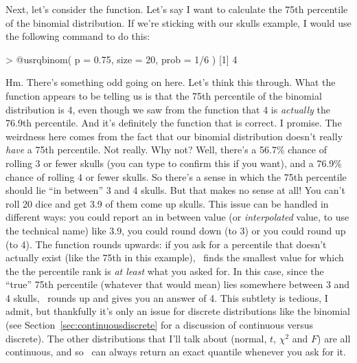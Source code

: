Next, let's consider the  function. Let's say I want to calculate the 75th percentile of the binomial distribution. If we're sticking with our skulls example, I would use the following command to do this: 
\begin{rblock1}
> @usr{qbinom( p = 0.75, size = 20, prob = 1/6 )}
[1] 4
\end{rblock1}
Hm. There's something odd going on here. Let's think this through. What the  function appears to be telling us is that the 75th percentile of the binomial distribution is 4, even though we saw from the  function that 4 is {\it actually} the 76.9th percentile. And it's definitely the  function that is correct. I promise. The weirdness here comes from the fact that our binomial distribution doesn't really {\it have} a 75th percentile. Not really. Why not? Well, there's a 56.7\% chance of rolling 3 or fewer skulls (you can type  to confirm this if you want), and a 76.9\% chance of rolling 4 or fewer skulls. So there's a sense in which the 75th percentile should lie ``in between'' 3 and 4 skulls. But that makes no sense at all! You can't roll 20 dice and get 3.9 of them come up skulls. This issue can be handled in different ways: you could report an in between value (or {\it interpolated} value, to use the technical name) like 3.9, you could round down (to 3) or you could round up (to 4). The  function rounds upwards: if you ask for a percentile that doesn't actually exist (like the 75th in this example), \R\ finds the smallest value for which the the percentile rank is {\it at least} what you asked for. In this case, since the ``true'' 75th percentile (whatever that would mean) lies somewhere between 3 and 4 skulls, \R\ rounds up and gives you an answer of 4. This subtlety is tedious, I admit, but thankfully it's only an issue for discrete distributions like the binomial (see Section~\ref{sec:continuousdiscrete} for a discussion of continuous versus discrete). The other distributions that I'll talk about (normal, $t$, $\chi^2$ and $F$) are all continuous, and so \R\ can always return an exact quantile whenever you ask for it.  

